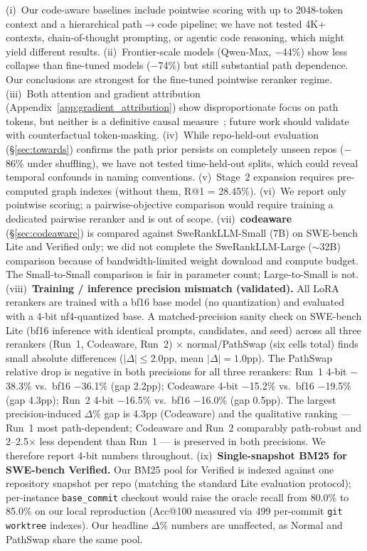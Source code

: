 \documentclass{article}
\begin{document}
(i)~Our code-aware baselines include pointwise scoring with up to 2048-token context and a hierarchical path$\to$code pipeline; we have not tested 4K+ contexts, chain-of-thought prompting, or agentic code reasoning, which might yield different results.
(ii)~Frontier-scale models (Qwen-Max, $-$44\%) show less collapse than fine-tuned models ($-$74\%) but still substantial path dependence. Our conclusions are strongest for the fine-tuned pointwise reranker regime.
(iii)~Both attention and gradient attribution (Appendix~\ref{app:gradient_attribution}) show disproportionate focus on path tokens, but neither is a definitive causal measure~\citep{jain2019attention}; future work should validate with counterfactual token-masking.
(iv)~While repo-held-out evaluation (\S\ref{sec:towards}) confirms the path prior persists on completely unseen repos ($-$86\% under shuffling), we have not tested time-held-out splits, which could reveal temporal confounds in naming conventions.
(v)~Stage~2 expansion requires pre-computed graph indexes (without them, R@1 = 28.45\%).
(vi)~We report only pointwise scoring; a pairwise-objective comparison would require training a dedicated pairwise reranker and is out of scope.
(vii)~\textbf{codeaware} (\S\ref{sec:codeaware}) is compared against SweRankLLM-Small (7B) on SWE-bench Lite and Verified only; we did not complete the SweRankLLM-Large ($\sim$32B) comparison because of bandwidth-limited weight download and compute budget. The Small-to-Small comparison is fair in parameter count; Large-to-Small is not.
(viii)~\textbf{Training / inference precision mismatch (validated).} All LoRA rerankers are trained with a bf16 base model (no quantization) and evaluated with a 4-bit nf4-quantized base. A matched-precision sanity check on SWE-bench Lite (bf16 inference with identical prompts, candidates, and seed) across all three rerankers (Run~1, Codeaware, Run~2) $\times$ normal/PathSwap (six cells total) finds small absolute differences ($|\Delta|{\leq}2.0$pp, mean $|\Delta|{=}1.0$pp). The PathSwap relative drop is negative in both precisions for all three rerankers: Run~1 4-bit $-$38.3\% vs.\ bf16 $-$36.1\% (gap 2.2pp); Codeaware 4-bit $-$15.2\% vs.\ bf16 $-$19.5\% (gap 4.3pp); Run~2 4-bit $-$16.5\% vs.\ bf16 $-$16.0\% (gap 0.5pp). The largest precision-induced $\Delta\%$ gap is 4.3pp (Codeaware) and the qualitative ranking — Run~1 most path-dependent; Codeaware and Run~2 comparably path-robust and 2--2.5$\times$ less dependent than Run~1 — is preserved in both precisions. We therefore report 4-bit numbers throughout.
(ix)~\textbf{Single-snapshot BM25 for SWE-bench Verified.} Our BM25 pool for Verified is indexed against one repository snapshot per repo (matching the standard Lite evaluation protocol); per-instance \texttt{base\_commit} checkout would raise the oracle recall from 80.0\% to 85.0\% on our local reproduction (Acc@100 measured via 499 per-commit \texttt{git worktree} indexes). Our headline $\Delta\%$ numbers are unaffected, as Normal and PathSwap share the same pool.
\end{document}
